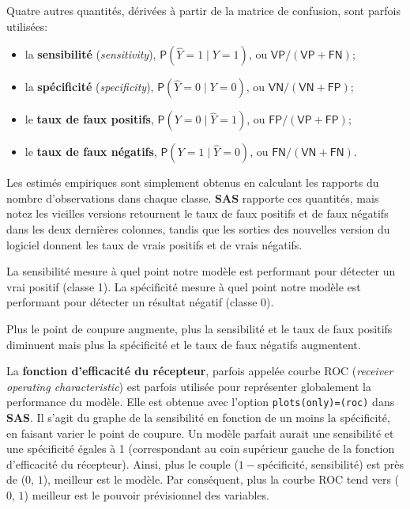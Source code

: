 \documentclass[
  11pt,
  letterpaper,
]{book}
\providecommand{\tightlist}{%
  \setlength{\itemsep}{0pt}\setlength{\parskip}{0pt}}
\theoremstyle{definition}
\theoremstyle{definition}
\theoremstyle{definition}
\theoremstyle{remark}
\begin{document}
Quatre autres quantités, dérivées à partir de la matrice de confusion, sont parfois utilisées:

\begin{itemize}
\tightlist
\item
  la \textbf{sensibilité} (\emph{sensitivity}), \({\mathsf P}\left(\widehat{Y}=1 \mid Y=1\right)\), ou \(\mathsf{VP}/(\mathsf{VP}+\mathsf{FN})\);
\item
  la \textbf{spécificité} (\emph{specificity}), \({\mathsf P}\left(\widehat{Y}=0 \mid Y=0\right)\), ou \(\mathsf{VN}/(\mathsf{VN}+\mathsf{FP})\);
\item
  le \textbf{taux de faux positifs}, \({\mathsf P}\left(Y=0 \mid \widehat{Y}=1\right)\), ou \(\mathsf{FP}/(\mathsf{VP}+\mathsf{FP})\);
\item
  le \textbf{taux de faux négatifs}, \({\mathsf P}\left(Y=1 \mid \widehat{Y}=0\right)\), ou \(\mathsf{FN}/(\mathsf{VN}+\mathsf{FN})\).
\end{itemize}

Les estimés empiriques sont simplement obtenus en calculant les rapports du nombre d'observations dans chaque classe. \textbf{SAS} rapporte ces quantités, mais notez les vieilles versions retournent le taux de faux positifs et de faux négatifs dans les deux dernières colonnes, tandis que les sorties des nouvelles version du logiciel donnent les taux de vrais positifs et de vrais négatifs.

La sensibilité mesure à quel point notre modèle est performant pour détecter un vrai positif (classe 1). La spécificité mesure à quel point notre modèle est performant pour détecter un résultat négatif (classe 0).

Plus le point de coupure augmente, plus la sensibilité et le taux de faux positifs diminuent mais plus la spécificité et le taux de faux négatifs augmentent.

La \textbf{fonction d'efficacité du récepteur}, parfois appelée courbe ROC (\emph{receiver operating characteristic}) est parfois utilisée pour représenter globalement la performance du modèle. Elle est obtenue avec l'option \texttt{plots(only)=(roc)} dans \textbf{SAS}. Il s'agit du graphe de la sensibilité en fonction de un moins la spécificité, en faisant varier le point de coupure. Un modèle parfait aurait une sensibilité et une spécificité égales à 1 (correspondant au coin supérieur gauche de la fonction d'efficacité du récepteur). Ainsi, plus le couple (\(1-\)spécificité, sensibilité) est près de (\(0\), \(1\)), meilleur est le modèle. Par conséquent, plus la courbe ROC tend vers (\(0\), \(1\)) meilleur est le pouvoir prévisionnel des variables.
\end{document}
